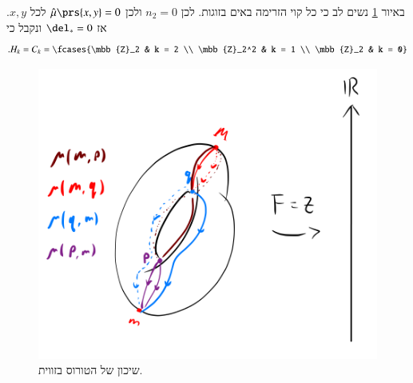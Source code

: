 \documentclass[a4paper,10pt,twoside,openany]{book}
\begin{document}
\begin{example}
באיור
\ref{5.3}
נשים לב כי כל קוי הזרימה באים בזוגות. לכן
$n_2 = 0$
ולכן
$\hat{\mu}\prs{x,y} = 0$
לכל
$x,y$.
אז
$\del_* = 0$
ונקבל כי
\[\text{.} H_k = C_k = \fcases{\mbb{Z}_2 & k = 2 \\ \mbb{Z}_2^2 & k = 1 \\ \mbb{Z}_2 & k = 0}\]
\end{example}

\begin{figure}
\centering
\includegraphics[scale=0.5]{sources/5.3}
\caption{שיכון של הטורוס בזווית.}
\label{5.3}
\end{figure}
\end{document}
